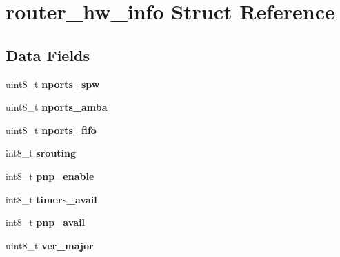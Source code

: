 \hypertarget{structrouter__hw__info}{}\section{router\+\_\+hw\+\_\+info Struct Reference}
\label{structrouter__hw__info}
\subsection*{Data Fields}
\begin{DoxyCompactItemize}
\item 
\mbox{\label{structrouter__hw__info_aa23a22d9c64d9589d333d2121ed2c32d}} 
uint8\+\_\+t {\bfseries nports\+\_\+spw}
\item 
\mbox{\label{structrouter__hw__info_a711f93578c4bb2bf3677fda7caf642fd}} 
uint8\+\_\+t {\bfseries nports\+\_\+amba}
\item 
\mbox{\label{structrouter__hw__info_a9354cad22628db2e22e2a6d0c1cc6ae1}} 
uint8\+\_\+t {\bfseries nports\+\_\+fifo}
\item 
\mbox{\label{structrouter__hw__info_a5d827cc715aa255a260267f02b3ddc4d}} 
int8\+\_\+t {\bfseries srouting}
\item 
\mbox{\label{structrouter__hw__info_a68054a8f2418496f274f02a2be0178b1}} 
int8\+\_\+t {\bfseries pnp\+\_\+enable}
\item 
\mbox{\label{structrouter__hw__info_a9913a329626e9ebd466521853b5179f7}} 
int8\+\_\+t {\bfseries timers\+\_\+avail}
\item 
\mbox{\label{structrouter__hw__info_acf8402fa759880b9f5f501aff4b83184}} 
int8\+\_\+t {\bfseries pnp\+\_\+avail}
\item 
\mbox{\label{structrouter__hw__info_ad5f278b222af7e8d0b3c37cab7bca83e}} 
uint8\+\_\+t {\bfseries ver\+\_\+major}
\item 
\mbox{\label{structrouter__hw__info_a2fa3c4bab58fe6615420821361eddca3}} 

\end{DoxyCompactItemize}
